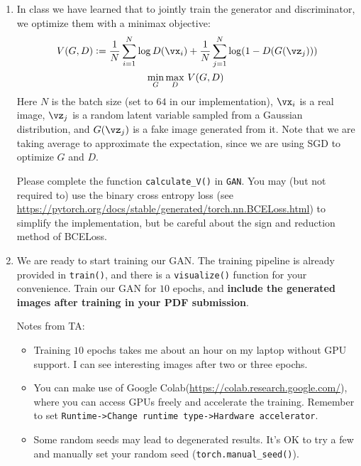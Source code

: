 \begin{Q}
\begin{enumerate}
    \item In class we have learned that to jointly train the generator and discriminator, we optimize them with a minimax objective:
    \begin{align*}
        V(G, D):=\frac{1}{N}\sum_{i=1}^N\log D(\vx_i)&+\frac{1}{N}\sum_{j=1}^N\log (1-D(G(\vz_j))) \\
        \min_G\max_D\ &V(G,D)
    \end{align*}
    Here $N$ is the batch size (set to $64$ in our implementation), $\vx_i$ is a real image, $\vz_j$ is a random latent variable sampled from a Gaussian distribution, and $G(\vz_j)$ is a fake image generated from it. Note that we are taking average to approximate the expectation, since we are using SGD to optimize $G$ and $D$.
    
    Please complete the function \texttt{calculate\_V()} in \texttt{GAN}. You may (but not required to) use the binary cross entropy loss (see \url{https://pytorch.org/docs/stable/generated/torch.nn.BCELoss.html}) to simplify the implementation, but be careful about the sign and reduction method of BCELoss.
    
    \item We are ready to start training our GAN. The training pipeline is already provided in \texttt{train()}, and there is a \texttt{visualize()} function for your convenience. Train our GAN for $10$ epochs, and \textbf{include the generated images after training in your PDF submission}.

    Notes from TA:
    \begin{itemize}
        \item Training $10$ epochs takes me about an hour on my laptop without GPU support. I can see interesting images after two or three epochs.
        \item You can make use of Google Colab(\url{https://colab.research.google.com/}), where you can access GPUs freely and accelerate the training. Remember to set \texttt{Runtime->Change runtime type->Hardware accelerator}.
        \item Some random seeds may lead to degenerated results. It's OK to try a few and manually set your random seed (\texttt{torch.manual\_seed()}).
    \end{itemize}
\end{enumerate}

\end{Q}